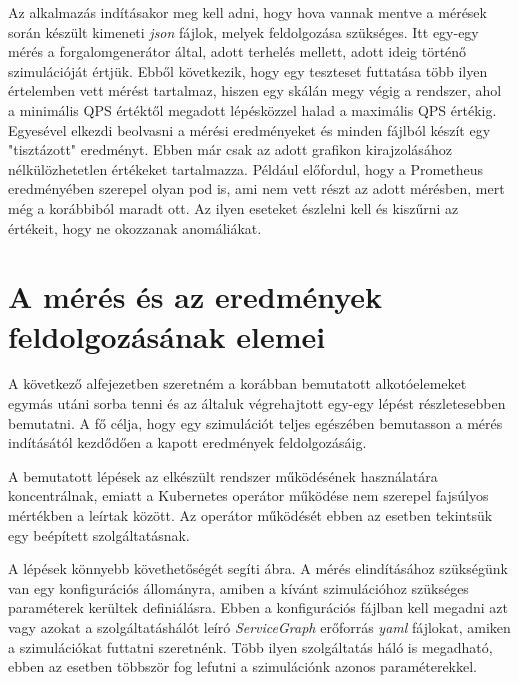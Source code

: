 %

Az alkalmazás indításakor meg kell adni, hogy hova vannak mentve a mérések során készült kimeneti \textit{json} fájlok, melyek feldolgozása szükséges.
Itt egy-egy mérés a forgalomgenerátor által, adott terhelés mellett, adott ideig történő szimulációját értjük.
Ebből következik, hogy egy teszteset futtatása több ilyen értelemben vett mérést tartalmaz, hiszen egy skálán megy végig a rendszer, ahol a minimális QPS értéktől megadott lépésközzel halad a maximális QPS értékig. 
Egyesével elkezdi beolvasni a mérési eredményeket és minden fájlból készít egy "tisztázott" eredményt.
Ebben már csak az adott grafikon kirajzolásához nélkülözhetetlen értékeket tartalmazza.
Például előfordul, hogy a Prometheus eredményében szerepel olyan pod is, ami nem vett részt az adott mérésben, mert még a korábbiból maradt ott.
Az ilyen eseteket észlelni kell és kiszűrni az értékeit, hogy ne okozzanak anomáliákat. 

\section{A mérés és az eredmények feldolgozásának elemei}
\label{sec:measure_steps}

A következő alfejezetben szeretném a korábban bemutatott alkotóelemeket egymás utáni sorba tenni és az általuk végrehajtott egy-egy lépést részletesebben bemutatni.
A fő célja, hogy egy szimulációt teljes egészében bemutasson a mérés indításától kezdődően a kapott eredmények feldolgozásáig.

A bemutatott lépések az elkészült rendszer működésének használatára koncentrálnak, emiatt a Kubernetes operátor működése nem szerepel fajsúlyos mértékben a leírtak között.
Az operátor működését ebben az esetben tekintsük egy beépített szolgáltatásnak.

A lépések könnyebb követhetőségét segíti  ábra.
A mérés elindításához szükségünk van egy konfigurációs állományra, amiben a kívánt szimulációhoz szükséges paraméterek kerültek definiálásra.
Ebben a konfigurációs fájlban kell megadni azt vagy azokat a szolgáltatáshálót leíró \textit{ServiceGraph} erőforrás \textit{yaml} fájlokat, amiken a szimulációkat futtatni szeretnénk.
Több ilyen szolgáltatás háló is megadható, ebben az esetben többször fog lefutni a szimulációnk azonos paraméterekkel.

